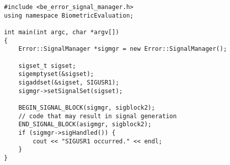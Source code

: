 \lstset{language=c++}
\begin{lstlisting}[caption={Using the SignalManger}, label=signalmanageruse]
#include <be_error_signal_manager.h>
using namespace BiometricEvaluation;

int main(int argc, char *argv[])
{
	Error::SignalManager *sigmgr = new Error::SignalManager();

	sigset_t sigset;
	sigemptyset(&sigset);
	sigaddset(&sigset, SIGUSR1);
	sigmgr->setSignalSet(sigset);

	BEGIN_SIGNAL_BLOCK(sigmgr, sigblock2);
	// code that may result in signal generation
	END_SIGNAL_BLOCK(asigmgr, sigblock2);
	if (sigmgr->sigHandled()) {
		cout << "SIGUSR1 occurred." << endl;
	}
}
\end{lstlisting}
